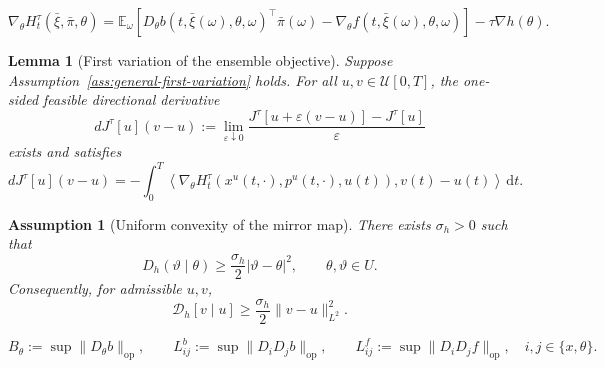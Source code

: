 \documentclass[10pt,a4paper]{amsart}
\newtheorem{assumption}{Assumption}
\newtheorem{lemma}{Lemma}
\newcommand{\dd}{\mathrm{d}}
\begin{document}
\begin{equation}
\label{eq:general-Hamiltonian-u-derivative}
\nabla_\theta H_t^\tau(\bar\xi,\bar\pi,\theta)
=
\mathbb E_\omega\!\left[
D_\theta b(t,\bar\xi(\omega),\theta,\omega)^\top
\bar\pi(\omega)
-
\nabla_\theta f(t,\bar\xi(\omega),\theta,\omega)
\right]
-
\tau\nabla h(\theta).
\end{equation}

\begin{lemma}[First variation of the ensemble objective]
\label{lem:first-variation-general}
Suppose Assumption~\ref{ass:general-first-variation} holds. For all
$u,v\in\mathcal U[0,T]$, the one-sided feasible directional derivative
\[
dJ^\tau[u](v-u):=\lim_{\varepsilon\downarrow0}
\frac{J^\tau[u+\varepsilon(v-u)]-J^\tau[u]}{\varepsilon}
\]
exists and satisfies
\begin{equation}
\label{eq:general-first-variation}
dJ^\tau[u](v-u)
=-\int_0^T\left\langle
\nabla_\theta H_t^\tau(x^u(t,\cdot),p^u(t,\cdot),u(t)),
v(t)-u(t)\right\rangle\,\dd t.
\end{equation}
\end{lemma}

\begin{assumption}[Uniform convexity of the mirror map]
\label{ass:mirror-map}
There exists $\sigma_h>0$ such that
\begin{equation}
\label{eq:uniform-convexity-h}
D_h(\vartheta\mid\theta)\ge\frac{\sigma_h}{2}|\vartheta-\theta|^2,
\qquad\theta,\vartheta\in U.
\end{equation}
Consequently, for admissible $u,v$,
\begin{equation}
\label{eq:integrated-uniform-convexity}
\mathcal D_h[v\mid u]\ge\frac{\sigma_h}{2}\|v-u\|_{L^2}^2.
\end{equation}
\end{assumption}

\begin{equation}
\label{eq:ensemble-convergence-bounds}
B_\theta:=\sup\|D_\theta b\|_{\mathrm{op}},
\qquad
L_{ij}^{b}:=\sup\|D_iD_jb\|_{\mathrm{op}},
\qquad
L_{ij}^{f}:=\sup\|D_iD_jf\|_{\mathrm{op}},
\quad i,j\in\{x,\theta\}.
\end{equation}
\end{document}
